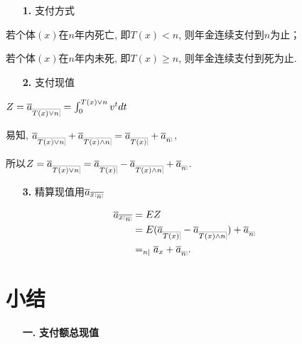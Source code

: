 \documentclass[a4paper,10pt]{ctexbook}
\makeatletter
\newcommand{\hei}{\CJKfamily{hei}}      %
\DeclareRobustCommand{\annu}[1]{_{%
    \def\arraystretch{0}%
    \setlength\arraycolsep{1pt}%
    \setlength\arrayrulewidth{.2pt}%
    \begin{array}[b]{@{}c|}\hline
        \\[\arraycolsep]%
        \scriptstyle #1%
    \end{array}%
}}
\makeatother
\begin{document}
\begin{itemize}
    \item[{\bf\hei 1.}] 支付方式
\end{itemize}

若个体$(x)$在$n$年内死亡, 即$T(x)<n$, 则年金连续支付到$n$为止；

若个体$(x)$在$n$年内未死, 即$T(x)\ge n$, 则年金连续支付到死为止.

\begin{itemize}
    \item[{\bf\hei 2.}] 支付现值
\end{itemize}

$Z=\overline {a}_{\annu{T(x)\lor n}}=\int_0^{{T(x)\lor n}}v^tdt$

易知, $\overline {a}_{\annu{T(x)\lor n}}+\overline {a}_{\annu{T(x)\land n}}=\overline {a}_{\annu{T(x)}}+\overline {a}_{\annu{n}}$,

所以$Z=\overline {a}_{\annu{T(x)\lor n}}=\overline {a}_{\annu{T(x)}}-\overline {a}_{\annu{T(x)\land n}}+\overline {a}_{\annu{n}}$.

\begin{itemize}
    \item[{\bf\hei 3.}] 精算现值用$\overline a_{\overline{x:\annu{n}}}$
\end{itemize}

$$
    \begin{aligned}
        \overline a_{\overline{x:\annu{n}}} & =EZ                                                                                        \\
                                            & =E(\overline a_{\annu {T(x) }}-\overline a_{\annu {T(x) \land n}})+\overline a_{\annu {n}} \\
                                            & =_{n|}\overline{a}_{x}+\overline a_{\annu {n}}
        .
    \end{aligned}
$$

\section{小结}
\begin{itemize}
    \item[{\bf\hei 一.}]{\bf\hei 支付额总现值}
\end{itemize}
\end{document}
